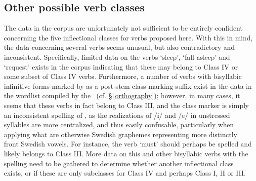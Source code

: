 \subsection{Other possible verb classes}\label{otherVerbClasses}
The data in the corpus are unfortunately not sufficient to be entirely confident concerning the five inflectional classes for verbs proposed here. With this in mind, the data concerning several verbs seems unusual, but also contradictory and inconsistent. Specifically, limited data on the verbs  ‘sleep’,  ‘fall asleep’  %
and  ‘request’ %
exists in the corpus indicating that these may belong to Class IV or some subset of Class IV verbs. Furthermore, a number of verbs with bisyllabic infinitive forms marked by  as a post-stem class-marking suffix exist in the data in the wordlist compiled by the \WLP\ (cf. §\,\ref{orthography}); however, in many cases, it seems that these verbs in fact belong to Class III, and the  class marker is simply an inconsistent spelling of , as the realizations of /i/ and /e/ in unstressed syllables are more centralized, and thus easily confusable, particularly when applying what are otherwise Swedish graphemes representing more distinctly front Swedish vowels. For instance, the verb  ‘must’ should perhaps be spelled  and likely belongs to Class III. More data on this and other bisyllabic verbs with the  spelling need to be gathered to determine whether another inflectional class exists, or if these are only subclasses for Class IV and perhaps Class I, II or III. 



